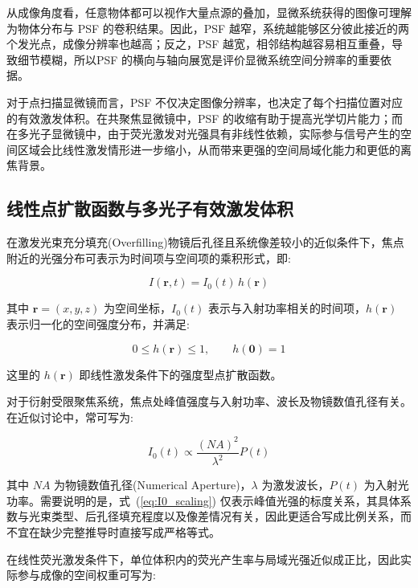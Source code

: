 从成像角度看，任意物体都可以视作大量点源的叠加，显微系统获得的图像可理解为物体分布与 PSF 的卷积结果。因此，PSF 越窄，系统越能够区分彼此接近的两个发光点，成像分辨率也越高；反之，PSF 越宽，相邻结构越容易相互重叠，导致细节模糊，所以PSF 的横向与轴向展宽是评价显微系统空间分辨率的重要依据。

对于点扫描显微镜而言，PSF 不仅决定图像分辨率，也决定了每个扫描位置对应的有效激发体积。在共聚焦显微镜中，PSF 的收缩有助于提高光学切片能力；而在多光子显微镜中，由于荧光激发对光强具有非线性依赖，实际参与信号产生的空间区域会比线性激发情形进一步缩小，从而带来更强的空间局域化能力和更低的离焦背景。




\subsection{线性点扩散函数与多光子有效激发体积}\label{2.2.1}
在激发光束充分填充(Overfilling)物镜后孔径且系统像差较小的近似条件下，焦点附近的光强分布可表示为时间项与空间项的乘积形式，即:

\begin{equation}
  I(\mathbf{r},t)=I_{0}(t)\,h(\mathbf{r})
  \label{eq:psf_separation}
\end{equation}

其中 $\mathbf{r}=(x,y,z)$ 为空间坐标，$I_{0}(t)$ 表示与入射功率相关的时间项，$h(\mathbf{r})$ 表示归一化的空间强度分布，并满足:

\begin{equation}
  0\le h(\mathbf{r})\le 1,\qquad h(\mathbf{0})=1
\end{equation}

这里的 $h(\mathbf{r})$ 即线性激发条件下的强度型点扩散函数。

对于衍射受限聚焦系统，焦点处峰值强度与入射功率、波长及物镜数值孔径有关。在近似讨论中，常可写为:

\begin{equation}
  I_{0}(t)\propto \frac{(NA)^2}{\lambda^2}P(t)
  \label{eq:I0_scaling}
\end{equation}

其中 $NA$ 为物镜数值孔径(Numerical Aperture)，$\lambda$ 为激发波长，$P(t)$ 为入射光功率。需要说明的是，式~(\ref{eq:I0_scaling}) 仅表示峰值光强的标度关系，其具体系数与光束类型、后孔径填充程度以及像差情况有关，因此更适合写成比例关系，而不宜在缺少完整推导时直接写成严格等式。

在线性荧光激发条件下，单位体积内的荧光产生率与局域光强近似成正比，因此实际参与成像的空间权重可写为:

